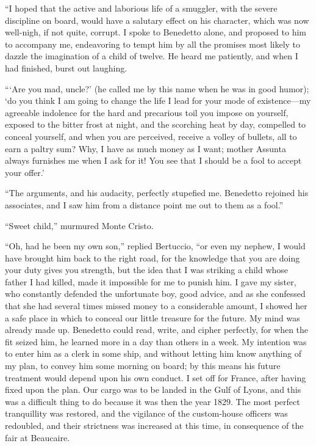 “I hoped that the active and laborious life of a smuggler, with the
severe discipline on board, would have a salutary effect on his
character, which was now well-nigh, if not quite, corrupt. I spoke to
Benedetto alone, and proposed to him to accompany me, endeavoring to
tempt him by all the promises most likely to dazzle the imagination of
a child of twelve. He heard me patiently, and when I had finished,
burst out laughing.

“‘Are you mad, uncle?’ (he called me by this name when he was in good
humor); ‘do you think I am going to change the life I lead for your
mode of existence—my agreeable indolence for the hard and precarious
toil you impose on yourself, exposed to the bitter frost at night, and
the scorching heat by day, compelled to conceal yourself, and when you
are perceived, receive a volley of bullets, all to earn a paltry sum?
Why, I have as much money as I want; mother Assunta always furnishes me
when I ask for it! You see that I should be a fool to accept your
offer.’

“The arguments, and his audacity, perfectly stupefied me. Benedetto
rejoined his associates, and I saw him from a distance point me out to
them as a fool.”

“Sweet child,” murmured Monte Cristo.

“Oh, had he been my own son,” replied Bertuccio, “or even my nephew, I
would have brought him back to the right road, for the knowledge that
you are doing your duty gives you strength, but the idea that I was
striking a child whose father I had killed, made it impossible for me
to punish him. I gave my sister, who constantly defended the
unfortunate boy, good advice, and as she confessed that she had several
times missed money to a considerable amount, I showed her a safe place
in which to conceal our little treasure for the future. My mind was
already made up. Benedetto could read, write, and cipher perfectly, for
when the fit seized him, he learned more in a day than others in a
week. My intention was to enter him as a clerk in some ship, and
without letting him know anything of my plan, to convey him some
morning on board; by this means his future treatment would depend upon
his own conduct. I set off for France, after having fixed upon the
plan. Our cargo was to be landed in the Gulf of Lyons, and this was a
difficult thing to do because it was then the year 1829. The most
perfect tranquillity was restored, and the vigilance of the
custom-house officers was redoubled, and their strictness was increased
at this time, in consequence of the fair at Beaucaire.

